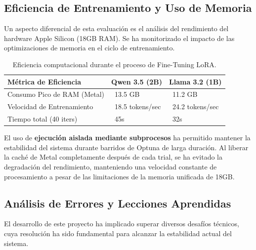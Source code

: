 \subsection{Eficiencia de Entrenamiento y Uso de Memoria}

Un aspecto diferencial de esta evaluación es el análisis del rendimiento del hardware Apple Silicon (18GB RAM). Se ha monitorizado el impacto de las optimizaciones de memoria en el ciclo de entrenamiento.

\begin{table}[H]
    \centering
    \begin{tabularx}{\textwidth}{|l|X|X|}
        \hline
        \textbf{Métrica de Eficiencia} & \textbf{Qwen 3.5 (2B)} & \textbf{Llama 3.2 (1B)} \\ \hline
        Consumo Pico de RAM (Metal)    & ~13.5 GB               & ~11.2 GB                \\ \hline
        Velocidad de Entrenamiento     & ~18.5 tokens/sec       & ~24.2 tokens/sec        \\ \hline
        Tiempo total (40 iters)        & ~45s                   & ~32s                    \\ \hline
    \end{tabularx}
    \caption{Eficiencia computacional durante el proceso de Fine-Tuning LoRA.}
    \label{tab:eficiencia_memoria}
\end{table}

El uso de \textbf{ejecución aislada mediante subprocesos} ha permitido mantener la estabilidad del sistema durante barridos de Optuna de larga duración. Al liberar la caché de Metal completamente después de cada trial, se ha evitado la degradación del rendimiento, manteniendo una velocidad constante de procesamiento a pesar de las limitaciones de la memoria unificada de 18GB.

\subsection{Análisis de Errores y Lecciones Aprendidas}

El desarrollo de este proyecto ha implicado superar diversos desafíos técnicos, cuya resolución ha sido fundamental para alcanzar la estabilidad actual del sistema.

